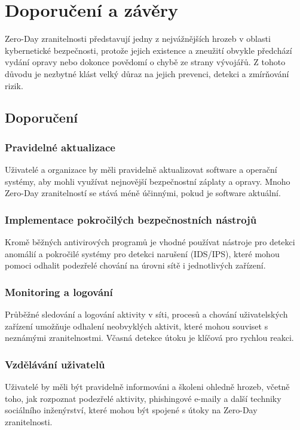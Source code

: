 \documentclass[11pt, conference, a4paper]{IEEEtran}
\begin{document}
\section{Doporučení a závěry}
Zero-Day zranitelnosti představují jedny z nejvážnějších hrozeb v oblasti kybernetické bezpečnosti, protože jejich existence a zneužití obvykle předchází vydání opravy nebo dokonce povědomí o chybě ze strany vývojářů. Z tohoto důvodu je nezbytné klást velký důraz na jejich prevenci, detekci a zmírňování rizik.

\subsection{Doporučení}
\subsubsection{Pravidelné aktualizace} Uživatelé a organizace by měli pravidelně aktualizovat software a operační systémy, aby mohli využívat nejnovější bezpečnostní záplaty a opravy. Mnoho Zero-Day zranitelností se stává méně účinnými, pokud je software aktuální.

\subsubsection{Implementace pokročilých bezpečnostních nástrojů} Kromě běžných antivirových programů je vhodné používat nástroje pro detekci anomálií a pokročilé systémy pro detekci narušení (IDS/IPS), které mohou pomoci odhalit podezřelé chování na úrovni sítě i jednotlivých zařízení.

\subsubsection{Monitoring a logování} Průběžné sledování a logování aktivity v síti, procesů a chování uživatelských zařízení umožňuje odhalení neobvyklých aktivit, které mohou souviset s neznámými zranitelnostmi. Včasná detekce útoku je klíčová pro rychlou reakci.

\subsubsection{Vzdělávání uživatelů} Uživatelé by měli být pravidelně informováni a školeni ohledně hrozeb, včetně toho, jak rozpoznat podezřelé aktivity, phishingové e-maily a další techniky sociálního inženýrství, které mohou být spojené s útoky na Zero-Day zranitelnosti.
\end{document}
